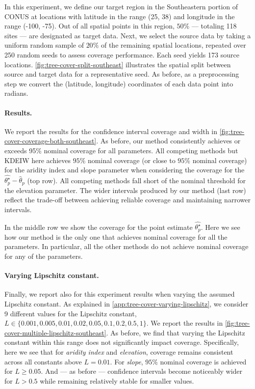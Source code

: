In this experiment, we define our target region in the Southeastern portion of CONUS at locations with latitude in the range (25, 38) and longitude in the range (-100, -75). Out of all spatial points in this region, $50\%$ --- totaling 118 sites --- are designated as target data. Next, we select the source data by taking a uniform random sample of $20\%$ of the remaining spatial locations, repeated over 250 random seeds to assess coverage performance. Each seed yields 173 source locations. \cref{fig:tree-cover-split-southeast} illustrates the spatial split between source and target data for a representative seed. As before, as a preprocessing step we convert the (latitude, longitude) coordinates of each data point into radians. 

\paragraph{Results.} We report the results for the confidence interval coverage and width in \cref{fig:tree-cover-coverage-both-southeast}. As before, our method consistently achieves or exceeds 95\% nominal coverage for all parameters. All competing methods but KDEIW here achieves $95\%$ nominal coverage (or close to $95\%$ nominal coverage) for the aridity index and slope parameter when considering the coverage for the $\hat{\theta_p^{\star}} - \hat{\theta}_p$ (top row). All competing methods fall short of the nominal threshold for the elevation parameter. The wider intervals produced by our method (last row) reflect the trade-off between achieving reliable coverage and maintaining narrower intervals.

In the middle row we show the coverage for the point estimate $\hat{\theta_p^{\star}}$. Here we see how our method is the only one that achieves nominal coverage for all the parameters. In particular, all the other methods do not achieve nominal coverage for any of the parameters.

\paragraph{Varying Lipschitz constant.} Finally, we report also for this experiment results when varying the assumed Lipschitz constant. As explained in \cref{app:tree-cover-varying-lipschitz}, we consider 9 different values for the Lipschitz constant, $L \in \{0.001, 0.005, 0.01, 0.02, 0.05, 0.1, 0.2, 0.5, 1\}$. We report the results in \cref{fig:tree-cover-multiple-lipschitz-southeast}. As before, we find that varying the Lipschitz constant within this range does not significantly impact coverage. Specifically, here we see that for \textit{aridity index} and \textit{elevation}, coverage remains consistent across all constants above $L = 0.01$. For \textit{slope}, $95\%$ nominal coverage is achieved for $L \geq 0.05$. And --- as before --- confidence intervals become noticeably wider for $L > 0.5$ while remaining relatively stable for smaller values.






